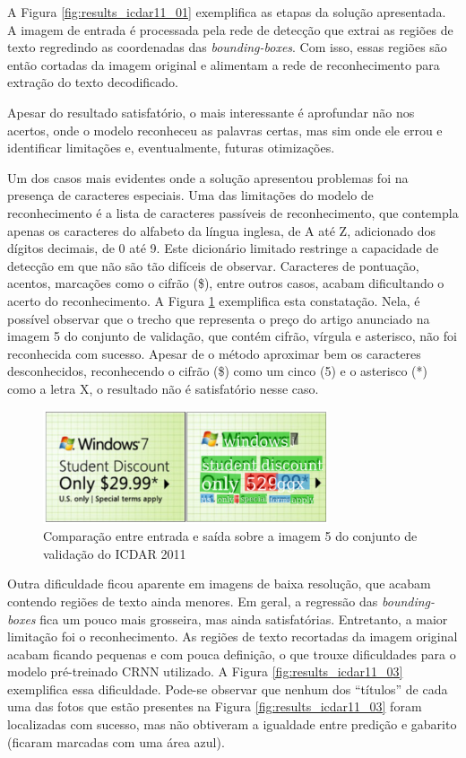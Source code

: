 A Figura \ref{fig:results_icdar11_01} exemplifica as etapas da solução apresentada. A imagem de entrada é processada pela rede de 
detecção que extrai as regiões de texto regredindo as coordenadas das \textit{bounding-boxes}. Com isso, essas regiões são então 
cortadas da imagem original e alimentam a rede de reconhecimento para extração do texto decodificado.

Apesar do resultado satisfatório, o mais interessante é aprofundar não nos acertos, onde o modelo reconheceu as palavras certas, 
mas sim onde ele errou e identificar limitações e, eventualmente, futuras otimizações.

Um dos casos mais evidentes onde a solução apresentou problemas foi na presença de caracteres especiais. Uma das limitações do 
modelo de reconhecimento é a lista de caracteres passíveis de reconhecimento, que contempla apenas os caracteres do alfabeto da 
língua inglesa, de A até Z, adicionado dos dígitos decimais, de 0 até 9. Este dicionário limitado restringe a capacidade 
de detecção em que não são tão difíceis de observar. Caracteres de pontuação, acentos, marcações como o cifrão (\$), entre 
outros casos, acabam dificultando o acerto do reconhecimento. A Figura \ref{fig:results_icdar11_02} exemplifica esta constatação. 
Nela, é possível observar que o trecho que representa o preço do artigo anunciado na imagem 5 do conjunto de validação, que 
contém cifrão, vírgula e asterisco, não foi reconhecida com sucesso. Apesar de o método aproximar bem os caracteres desconhecidos, 
reconhecendo o cifrão (\$) como um cinco (5) e o asterisco (*) como a letra X, o resultado não é satisfatório nesse caso.

\begin{figure}
    \centering
    \includegraphics[width=0.75\textwidth]{figs/resultados-icdar11-02.png}
    \caption{Comparação entre entrada e saída sobre a imagem 5 do conjunto de validação do ICDAR 2011}
    \label{fig:results_icdar11_02}
\end{figure}

Outra dificuldade ficou aparente em imagens de baixa resolução, que acabam contendo regiões de texto ainda menores. Em geral, 
a regressão das \textit{bounding-boxes} fica um pouco mais grosseira, mas ainda satisfatórias. Entretanto, a maior limitação 
foi o reconhecimento. As regiões de texto recortadas da imagem original acabam ficando pequenas e com pouca definição, o 
que trouxe dificuldades para o modelo pré-treinado CRNN utilizado. A Figura \ref{fig:results_icdar11_03} exemplifica essa 
dificuldade. Pode-se observar que nenhum dos “títulos” de cada uma das fotos que estão presentes na Figura \ref{fig:results_icdar11_03} 
foram localizadas com sucesso, mas não obtiveram a igualdade entre predição e gabarito (ficaram marcadas com uma área azul).

